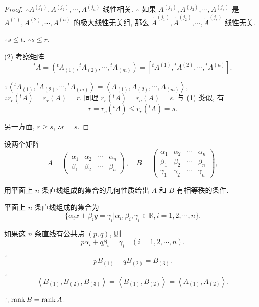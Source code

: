 \documentclass[color=black,device=normal,lang=cn,mode=geye]{elegantnote}
\begin{document}
\begin{proof}
    $\therefore A^{(j_1)},A^{(j_2)},\cdots,A^{(j_u)}$ 线性相关. $\therefore$ 如果 $A^{(j_1)},A^{(j_2)},\cdots,A^{(j_s)}$ 是 $A^{(1)},A^{(2)},\cdots,A^{(n)}$ 的极大线性无关组, 那么 $\widetilde{A}^{(j_1)},\widetilde{A}^{(j_2)},\cdots,\widetilde{A}^{(j_s)}$ 线性无关.
    
    $\therefore s\leq t$. $\therefore s\leq r$.

    (2) 考察矩阵
    \[{}^tA=({}^tA_{(1)},{}^tA_{(2)},\cdots,{}^tA_{(m)})=[{}^tA^{(1)},{}^tA^{(2)},\cdots,{}^tA^{(n)}].\]

    $\because\left<{}^tA_{(1)},{}^tA_{(2)},\cdots,{}^tA_{(m)}\right>=\left<A_{(1)},A_{(2)},\cdots,A_{(m)}\right>$, $\therefore r_c({}^tA)=r_r(A)=r$. 同理 $r_r({}^tA)=r_c(A)=s$. 与 (1) 类似, 有
    \[r=r_c({}^tA)\leq r_r({}^tA)=s.\]

    另一方面, $r\geq s$, $\therefore r=s$.
\end{proof}
\setcounter{exercise}{2}
\begin{exercise}%
    设两个矩阵
    \[A=\begin{pmatrix}
        \alpha_1 & \alpha_2 & \cdots & \alpha_n \\
        \beta_1 &  \beta_2 & \cdots &  \beta_n
    \end{pmatrix},\quad B=\begin{pmatrix}
        \alpha_1 & \alpha_2 & \cdots & \alpha_n \\
        \beta_1 &  \beta_2 & \cdots &  \beta_n \\
        \gamma_1 & \gamma_2 & \cdots & \gamma_n
    \end{pmatrix},\]

    用平面上 $n$ 条直线组成的集合的几何性质给出 $A$ 和 $B$ 有相等秩的条件.
\end{exercise}
\begin{solution}
    平面上 $n$ 条直线组成的集合为
    \[\{\alpha_ix+\beta_iy=\gamma_i|\alpha_i,\beta_i,\gamma_i\in\mathbb{R},i=1,2,\cdots,n\}.\]

    如果这 $n$ 条直线有公共点 $(p,q)$, 则
    \[p\alpha_i+q\beta_i=\gamma_i\quad(i=1,2,\cdots,n).\]

    $\therefore$
    \[pB_{(1)}+qB_{(2)}=B_{(3)}.\]

    $\therefore$
    \[\left<B_{(1)},B_{(2)},B_{(3)}\right>=\left<B_{(1)},B_{(2)}\right>=\left<A_{(1)},A_{(2)}\right>.\]

    $\therefore\operatorname{rank} B=\operatorname{rank} A$.
\end{solution}
\end{document}
